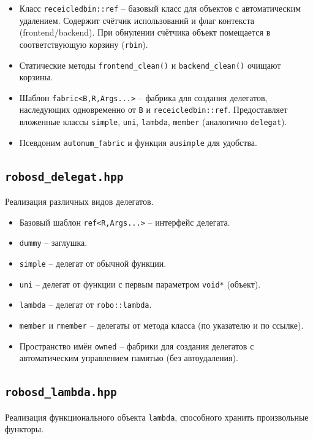 \documentclass[a4paper,12pt]{article}
\begin{document}
\begin{itemize}
    \item Класс \texttt{receicledbin::ref} -- базовый класс для объектов с автоматическим удалением. Содержит счётчик использований и флаг контекста (frontend/backend). При обнулении счётчика объект помещается в соответствующую корзину (\texttt{rbin}).
    \item Статические методы \texttt{frontend\_clean()} и \texttt{backend\_clean()} очищают корзины.
    \item Шаблон \texttt{fabric<B,R,Args...>} -- фабрика для создания делегатов, наследующих одновременно от \texttt{B} и \texttt{receicledbin::ref}. Предоставляет вложенные классы \texttt{simple}, \texttt{uni}, \texttt{lambda}, \texttt{member} (аналогично \texttt{delegat}).
    \item Псевдоним \texttt{autonum\_fabric} и функция \texttt{ausimple} для удобства.
\end{itemize}

\subsection{\texttt{robosd\_delegat.hpp}}

Реализация различных видов делегатов.

\begin{itemize}
    \item Базовый шаблон \texttt{ref<R,Args...>} -- интерфейс делегата.
    \item \texttt{dummy} -- заглушка.
    \item \texttt{simple} -- делегат от обычной функции.
    \item \texttt{uni} -- делегат от функции с первым параметром \texttt{void*} (объект).
    \item \texttt{lambda} -- делегат от \texttt{robo::lambda}.
    \item \texttt{member} и \texttt{rmember} -- делегаты от метода класса (по указателю и по ссылке).
    \item Пространство имён \texttt{owned} -- фабрики для создания делегатов с автоматическим управлением памятью (без автоудаления).
\end{itemize}

\subsection{\texttt{robosd\_lambda.hpp}}

Реализация функционального объекта \texttt{lambda}, способного хранить произвольные функторы.
\end{document}
